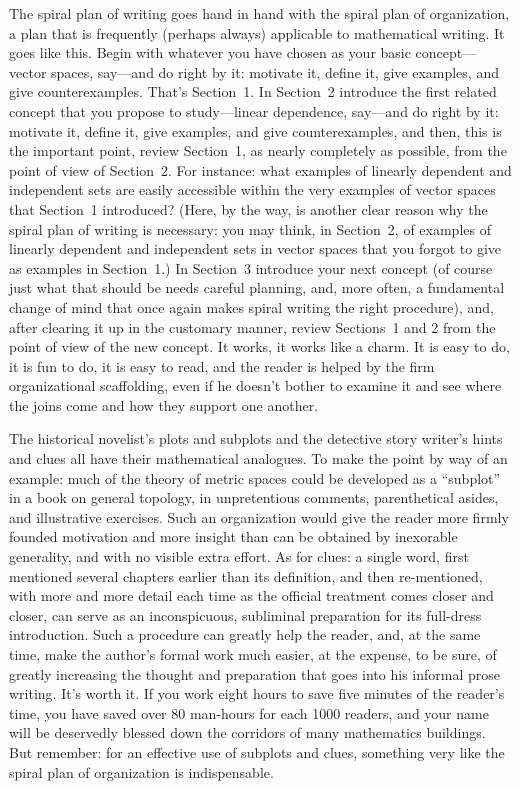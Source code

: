 \documentclass[12pt]{article}
\begin{document}
The spiral plan of writing goes hand in hand with the spiral plan of organization, a plan that is frequently (perhaps always) applicable to mathematical writing. It goes like this. Begin with whatever you have chosen as your basic concept---vector spaces, say---and do right by it: motivate it, define it, give examples, and give counterexamples. That's Section~1. In Section~2 introduce the first related concept that you propose to study---linear dependence, say---and do right by it: motivate it, define it, give examples, and give counterexamples, and then, this is the important point, review Section~1, as nearly completely as possible, from the point of view of Section~2. For instance: what examples of linearly dependent and independent sets are easily accessible within the very examples of vector spaces that Section~1 introduced? (Here, by the way, is another clear reason why the spiral plan of writing is necessary: you may think, in Section~2, of examples of linearly dependent and independent sets in vector spaces that you forgot to give as examples in Section~1.) In Section~3 introduce your next concept (of course just what that should be needs careful planning, and, more often, a fundamental change of mind that once again makes spiral writing the right procedure), and, after clearing it up in the customary manner, review Sections~1 and 2 from the point of view of the new concept. It works, it works like a charm. It is easy to do, it is fun to do, it is easy to read, and the reader is helped by the firm organizational scaffolding, even if he doesn't bother to examine it and see where the joins come and how they support one another. 

The historical novelist's plots and subplots and the detective story writer's hints and clues all have their mathematical analogues. To make the point by way of an example: much of the theory of metric spaces could be developed as a ``subplot'' in a book on general topology, in unpretentious comments, parenthetical asides, and illustrative exercises. Such an organization would give the reader more firmly founded motivation and more insight than can be obtained by inexorable generality, and with no visible extra effort. As for clues: a single word, first mentioned several chapters earlier than its definition, and then re-mentioned, with more and more detail each time as the official treatment comes closer and closer, can serve as an inconspicuous, subliminal preparation for its full-dress introduction. Such a procedure can greatly help the reader, and, at the same time, make the author's formal work much easier, at the expense, to be sure, of greatly increasing the thought and preparation that goes into his informal prose writing. It's worth it. If you work eight hours to save five minutes of the reader's time, you have saved over 80 man-hours for each 1000 readers, and your name will be deservedly blessed down the corridors of many mathematics buildings. But remember: for an effective use of subplots and clues, something very like the spiral plan of organization is indispensable.
\end{document}
